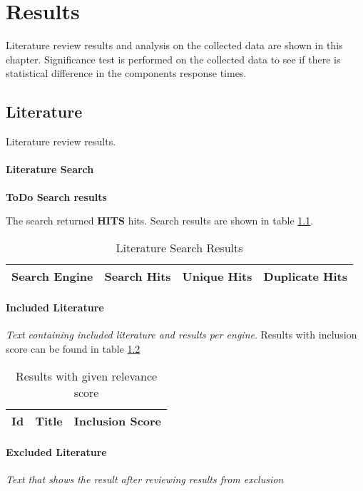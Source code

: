 \chapter{Results\label{results}}
Literature review results and analysis on the collected data are shown in this chapter.
Significance test is performed on the collected data to see if there is statistical difference in the components response times.

\section{Literature}
Literature review results.

\subsubsection{Literature Search}
\textbf{ToDo Search results}

The search returned \textbf{HITS} hits.
Search results are shown in table \ref{table:literature:searchResults}.

\begin{table}[h!]
    \begin{tabular}{|c|c|c|c|} 
        \hline
        Search Engine
        & Search Hits
        & Unique Hits
        & Duplicate Hits
        \\ 
        \hline
    \end{tabular}    
    \caption{Literature Search Results}
    \label{table:literature:searchResults}
\end{table}

\subsubsection{Included Literature}
\textit{Text containing included literature and results per engine}.
Results with inclusion score can be found in table \ref{table:literature:inclusionResults}

\begin{table}[h!]
    \begin{tabular}{| c | c | c |}
        \hline
        Id
        & Title
        & Inclusion Score
        \\
        \hline
    \end{tabular}
    \caption{Results with given relevance score}
    \label{table:literature:inclusionResults}
\end{table}

\subsubsection{Excluded Literature}
\textit{Text that shows the result after reviewing results from exclusion}


